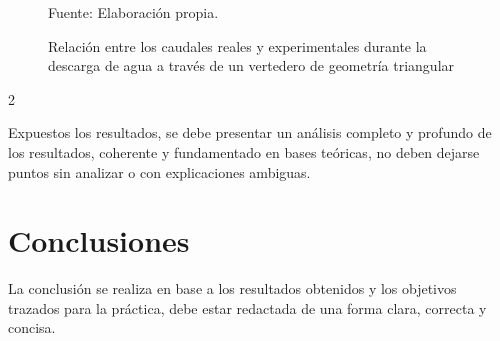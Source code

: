 \documentclass[11pt]{article}
\begin{document}
\begin{figure}[H]
    \centering
    \caption{Relación entre los caudales reales y experimentales durante la descarga de agua a través de un vertedero de geometría triangular}
\begin{mdframed}
\centering 
\end{mdframed}
    \label{fig:1}
\begin{minipage}{\columnwidth}
\centering Fuente: Elaboración propia.
\end{minipage}
\end{figure}
\begin{multicols}{2}


Expuestos los resultados, se debe presentar un análisis completo y profundo de los resultados, coherente y fundamentado en bases teóricas, no deben dejarse puntos sin analizar o con explicaciones ambiguas.

\section{Conclusiones}

La conclusión se realiza en base a los resultados obtenidos y los objetivos trazados para la práctica, debe estar redactada de una forma clara, correcta y concisa.


 


\end{multicols}
\end{document}
